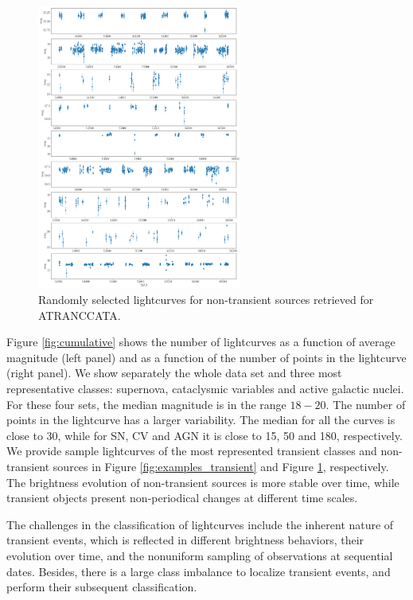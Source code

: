 \documentclass[usenatbib]{mnras}
\begin{document}
\begin{figure}
  \includegraphics[width=0.6\textwidth]{examples_nontransient.pdf}
  \caption{Randomly selected lightcurves for non-transient sources retrieved for ATRANCCATA.}
  \label{fig:examples_non_transient}
\end{figure} 

Figure \ref{fig:cumulative} shows the number of lightcurves as a
function of average magnitude (left panel) and as a function of the
number of points in the lightcurve (right panel).
We show separately the whole data set and three most representative
classes: supernova, cataclysmic variables and active galactic nuclei. 
For these four sets, the median magnitude is in the range $18-20$. 
The number of points in the lightcurve has a larger variability.
The median for all the curves is close to 30, while for SN, CV and
AGN it is close to 15, 50 and 180, respectively. 
We provide sample lightcurves of the most represented transient classes 
and non-transient sources in Figure \ref{fig:examples_transient} and Figure \ref{fig:examples_non_transient}, respectively. 
The brightness evolution of non-transient sources is more stable over time, 
while transient objects present non-periodical changes at different time scales. 

The challenges in the classification of lightcurves 
include the inherent nature of transient events, which is reflected 
in different brightness behaviors, their evolution over time, and 
the nonuniform sampling of observations at sequential dates. 
Besides, there is a large class imbalance to localize transient events, 
and perform their subsequent classification. 
\end{document}
